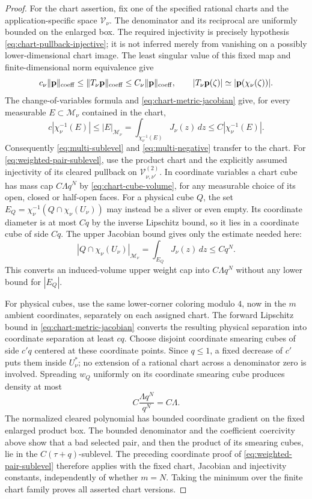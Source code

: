 \documentclass[11pt]{article}
\numberwithin{equation}{section}
\theoremstyle{remark}
\theoremstyle{definition}
\newcommand{\norm}[1]{\lVert #1\rVert}
\begin{document}
\begin{proof}
For the chart assertion, fix one of the specified rational charts and
the application-specific space $\mathcal V_\nu$.  The denominator and its
reciprocal are uniformly bounded on the enlarged box.  The required
injectivity is precisely hypothesis
\eqref{eq:chart-pullback-injective}; it is not inferred merely from
vanishing on a possibly lower-dimensional chart image.  The least
singular value of this fixed map and finite-dimensional norm equivalence
give
\[
 c_\nu\norm{\mathbf p}_{\rm coeff}
 \le\norm{T_\nu\mathbf p}_{\rm coeff}
 \le C_\nu\norm{\mathbf p}_{\rm coeff},
 \qquad
 |T_\nu\mathbf p(\zeta)|
 \simeq|\mathbf p(\chi_\nu(\zeta))|.
\]
The change-of-variables formula and \eqref{eq:chart-metric-jacobian} give,
for every measurable $E\subset\mathcal M_\nu$ contained in the chart,
\[
 c|\chi_\nu^{-1}(E)|
 \le |E|_{\mathcal M_\nu}
 =\int_{\chi_\nu^{-1}(E)}J_\nu(z)\,dz
 \le C|\chi_\nu^{-1}(E)|.
\]
Consequently \eqref{eq:multi-sublevel} and
\eqref{eq:multi-negative} transfer to the chart.  For
\eqref{eq:weighted-pair-sublevel}, use the product chart and the explicitly
assumed injectivity of its cleared pullback on
$\mathcal V^{(2)}_{\nu,\nu'}$.  In coordinate variables a chart cube has
mass cap $C\Lambda q^N$ by \eqref{eq:chart-cube-volume}, for any measurable
choice of its open, closed or half-open faces.  For a physical cube $Q$,
the set $E_Q=\chi_\nu^{-1}(Q\cap\chi_\nu(U_\nu))$ may instead be a
sliver or even empty.  Its coordinate diameter is at most $Cq$ by the
inverse Lipschitz bound, so it lies in a coordinate cube of side $Cq$.
The upper Jacobian bound gives only the estimate needed here:
\[
 |Q\cap\chi_\nu(U_\nu)|_{\mathcal M_\nu}
 =\int_{E_Q}J_\nu(z)\,dz\le Cq^N.
\]
This converts an induced-volume upper weight cap into $C\Lambda q^N$
without any lower bound for $|E_Q|$.

For physical cubes, use the same lower-corner coloring modulo $4$, now
in the $m$ ambient coordinates, separately on each assigned chart.
The forward Lipschitz bound in \eqref{eq:chart-metric-jacobian} converts
the resulting physical separation into coordinate separation at least
$cq$.  Choose disjoint coordinate smearing cubes of side $c'q$ centered
at these coordinate points.  Since $q\le1$, a fixed decrease of $c'$
puts them inside $U_\nu^*$; no extension of a rational chart across a
denominator zero is involved.  Spreading $w_Q$ uniformly on its
coordinate smearing cube produces density at most
\[
 C\frac{\Lambda q^N}{q^N}=C\Lambda.
\]
The normalized cleared polynomial has bounded coordinate gradient on
the fixed enlarged product box.  The bounded denominator and the
coefficient coercivity above show that a bad selected pair, and then the
product of its smearing cubes, lie in the $C(\tau+q)$-sublevel.
The preceding coordinate proof of \eqref{eq:weighted-pair-sublevel}
therefore applies with the fixed chart, Jacobian and injectivity
constants, independently of whether $m=N$.  Taking the
minimum over the finite chart family proves all asserted chart versions.
\end{proof}
\end{document}
